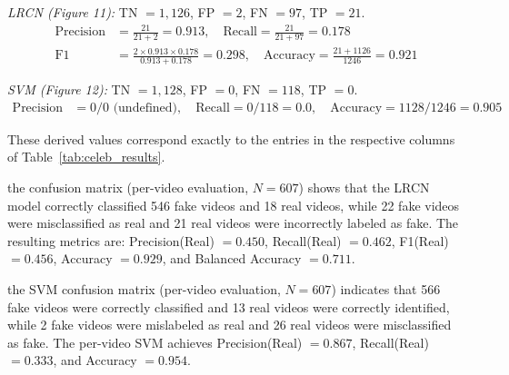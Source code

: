 \noindent\textit{LRCN (Figure 11):}
TN $= 1{,}126$, FP $= 2$, FN $= 97$, TP $= 21$.
\begin{align*}
\text{Precision} &= \frac{21}{21 + 2} = 0.913, \quad
\text{Recall} = \frac{21}{21 + 97} = 0.178 \\
\text{F1} &= \frac{2 \times 0.913 \times 0.178}{0.913 + 0.178} = 0.298, \quad
\text{Accuracy} = \frac{21 + 1126}{1246} = 0.921
\end{align*}

\noindent\textit{SVM (Figure 12):}
TN $= 1{,}128$, FP $= 0$, FN $= 118$, TP $= 0$.
\begin{align*}
\text{Precision} &= 0/0 \text{ (undefined)}, \quad
\text{Recall} = 0/118 = 0.0, \quad
\text{Accuracy} = 1128/1246 = 0.905
\end{align*}

\noindent These derived values correspond exactly to the entries in the respective columns of Table~\ref{tab:celeb_results}.




the confusion matrix (per-video evaluation, $N = 607$) shows that the LRCN model correctly classified 546 fake videos and 18 real videos, while 22 fake videos were misclassified as real and 21 real videos were incorrectly labeled as fake. The resulting metrics are: Precision(Real) $= 0.450$, Recall(Real) $= 0.462$, F1(Real) $= 0.456$, Accuracy $= 0.929$, and Balanced Accuracy $= 0.711$.



the SVM confusion matrix (per-video evaluation, $N = 607$) indicates that 566 fake videos were correctly classified and 13 real videos were correctly identified, while 2 fake videos were mislabeled as real and 26 real videos were misclassified as fake. The per-video SVM achieves Precision(Real) $= 0.867$, Recall(Real) $= 0.333$, and Accuracy $= 0.954$.


